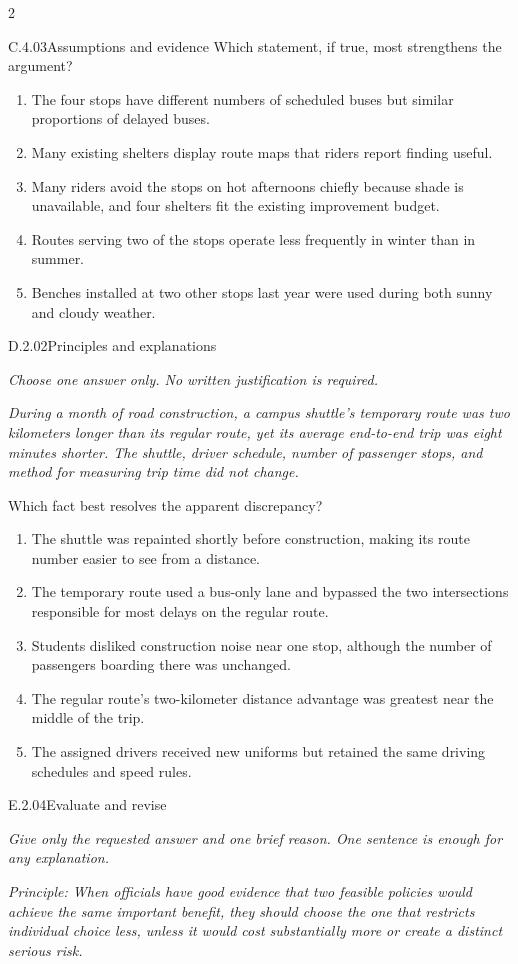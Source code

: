 \documentclass[9pt]{extarticle}
\newcommand{\choice}[1]{\item #1}
\begin{document}
\begin{multicols}{2}
\begin{DenseCoreProblem}{C.4.03}{Assumptions and evidence}
Which statement, if true, most strengthens the argument?
\begin{enumerate}[label=(\alph*)]
  \choice{The four stops have different numbers of scheduled buses but similar proportions of delayed buses.}
  \choice{Many existing shelters display route maps that riders report finding useful.}
  \choice{Many riders avoid the stops on hot afternoons chiefly because shade is unavailable, and four shelters fit the existing improvement budget.}
  \choice{Routes serving two of the stops operate less frequently in winter than in summer.}
  \choice{Benches installed at two other stops last year were used during both sunny and cloudy weather.}
\end{enumerate}
\end{DenseCoreProblem}
\begin{DenseCoreProblem}{D.2.02}{Principles and explanations}
{\scriptsize\textit{Choose one answer only. No written justification is required.}\par}
\emph{During a month of road construction, a campus shuttle's temporary route was two kilometers longer than its regular route, yet its average end-to-end trip was eight minutes shorter. The shuttle, driver schedule, number of passenger stops, and method for measuring trip time did not change.}

Which fact best resolves the apparent discrepancy?
\begin{enumerate}[label=(\alph*)]
  \choice{The shuttle was repainted shortly before construction, making its route number easier to see from a distance.}
  \choice{The temporary route used a bus-only lane and bypassed the two intersections responsible for most delays on the regular route.}
  \choice{Students disliked construction noise near one stop, although the number of passengers boarding there was unchanged.}
  \choice{The regular route's two-kilometer distance advantage was greatest near the middle of the trip.}
  \choice{The assigned drivers received new uniforms but retained the same driving schedules and speed rules.}
\end{enumerate}
\end{DenseCoreProblem}
\begin{DenseCoreProblem}{E.2.04}{Evaluate and revise}
{\scriptsize\textit{Give only the requested answer and one brief reason. One sentence is enough for any explanation.}\par}
\emph{Principle: When officials have good evidence that two feasible policies would achieve the same important benefit, they should choose the one that restricts individual choice less, unless it would cost substantially more or create a distinct serious risk.}


\end{DenseCoreProblem}
\end{multicols}
\end{document}
